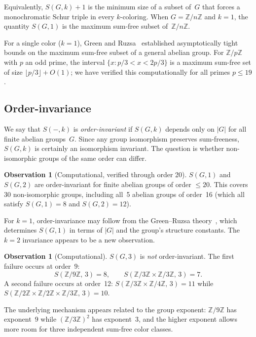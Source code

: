 \documentclass[11pt]{article}
\theoremstyle{plain}
\theoremstyle{definition}
\newtheorem{observation}[theorem]{Observation}
\newcommand{\ZZ}{\mathbb{Z}}
\begin{document}
\noindent
Equivalently, $S(G,k)+1$ is the minimum size of a subset of~$G$ that
forces a monochromatic Schur triple in every $k$-coloring.
When $G=\ZZ/n\ZZ$ and $k=1$, the quantity $S(G,1)$ is the maximum
sum-free subset of~$\ZZ/n\ZZ$.

For a single color ($k=1$), Green and
Ruzsa~\cite{green-ruzsa} established asymptotically tight bounds on
the maximum sum-free subset of a general abelian group.
For $\ZZ/p\ZZ$ with $p$ an odd prime, the interval
$\{x : p/3 < x < 2p/3\}$ is a maximum sum-free set of size
$\lfloor p/3 \rfloor + O(1)$; we have verified this computationally
for all primes $p \le 19$.

\subsection{Order-invariance}

We say that $S(-,k)$ is \emph{order-invariant} if $S(G,k)$
depends only on $|G|$ for all finite abelian groups~$G$.
Since any group isomorphism preserves sum-freeness, $S(G,k)$
is certainly an isomorphism invariant.
The question is whether non-isomorphic groups of the same order can
differ.

\begin{observation}[Computational, verified through order 20]\label{obs:inv}
$S(G,1)$ and $S(G,2)$ are order-invariant for finite abelian groups
of order $\le 20$.
This covers 30 non-isomorphic groups, including all~5 abelian
groups of order~16 (which all satisfy $S(G,1)=8$ and $S(G,2)=12$).
\end{observation}

\noindent
For $k=1$, order-invariance may follow from the Green--Ruzsa
theory~\cite{green-ruzsa}, which determines $S(G,1)$ in terms of
$|G|$ and the group's structure constants.
The $k=2$ invariance appears to be a new observation.

\begin{observation}[Computational]\label{obs:break}
$S(G,3)$ is \emph{not} order-invariant.
The first failure occurs at order~$9$:
\[
S(\ZZ/9\ZZ,\, 3) = 8, \qquad
S(\ZZ/3\ZZ\times\ZZ/3\ZZ,\, 3) = 7.
\]
A second failure occurs at order~12:
$S(\ZZ/3\ZZ\times\ZZ/4\ZZ,\, 3) = 11$ while
$S(\ZZ/2\ZZ\times\ZZ/2\ZZ\times\ZZ/3\ZZ,\, 3) = 10$.
\end{observation}

\noindent
The underlying mechanism appears related to the group exponent:
$\ZZ/9\ZZ$ has exponent~$9$ while
$(\ZZ/3\ZZ)^2$ has exponent~$3$, and the higher exponent allows more
room for three independent sum-free color classes.
\end{document}
